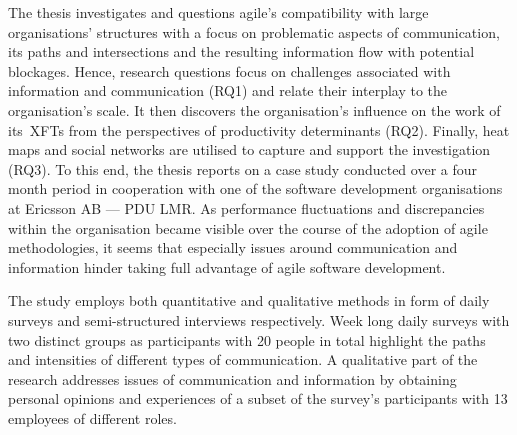 The thesis investigates and questions agile's compatibility with large organisations' structures with a focus on problematic aspects of communication, its paths and intersections and the resulting information flow with potential blockages. Hence, research questions focus on challenges associated with information and communication (RQ1) and relate their interplay to the organisation's scale. It then discovers the organisation's influence on the work of its~\acp{XFT} from the perspectives of productivity determinants (RQ2). Finally, heat maps and social networks are utilised to capture and support the investigation (RQ3). To this end, the thesis reports on a case study conducted over a four month period in cooperation with one of the software development organisations at Ericsson AB --- \ac{PDU LMR}. As performance fluctuations and discrepancies within the organisation became visible over the course of the adoption of agile methodologies, it seems that especially issues around communication and information hinder taking full advantage of agile software development.

The study employs both quantitative and qualitative methods in form of daily surveys and semi-structured interviews respectively. Week long daily surveys with two distinct groups as participants with 20 people in total highlight the paths and intensities of different types of communication. A qualitative part of the research addresses issues of communication and information by obtaining personal opinions and experiences of a subset of the survey's participants with 13 employees of different roles.

